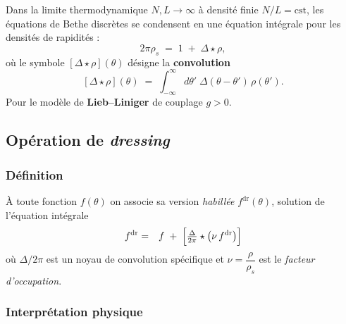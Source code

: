 Dans la limite thermodynamique $N,L\to\infty$ à densité finie
$N/L=\text{cst}$, les équations de Bethe discrètes se condensent en une
équation intégrale pour les densités de rapidités :
\begin{equation}
2\pi \rho_s \;=\; 1 \;+\;\Delta \star \rho,
\label{eq:TBA-rhos}
\end{equation}
où le symbole 
\(
[\Delta \star \rho](\theta)
\)
désigne la \textbf{convolution}
\[
[\Delta \star \rho](\theta)\;=\; \int_{-\infty}^{\infty}
      \!d\theta'\; \Delta(\theta-\theta')\,\rho(\theta').
\]
Pour le modèle de \textbf{Lieb–Liniger} de couplage $g>0$.  

\subsection{Opération de \emph{dressing}}
\label{sec:dressing}

\subsubsection{Définition}

À toute fonction  $f(\theta)$ on associe sa version \emph{habillée}
$f^{\mathrm{dr}}(\theta)$, solution de l’équation intégrale
\begin{eqnarray}
	f^{\mathrm{dr}} & = & f  \;+\;\Bigl[\tfrac{\Delta}{2\pi}\star\bigl(\nu\,f^{\mathrm{dr}}\bigr)\Bigr] \label{eq:dressing}	
\end{eqnarray}
où $\Delta/2\pi$ est un noyau de convolution spécifique et 
\(
\nu=\dfrac{\rho}{\rho_s}
\)
est le \emph{facteur d’occupation}.

\subsubsection{Interprétation physique}


